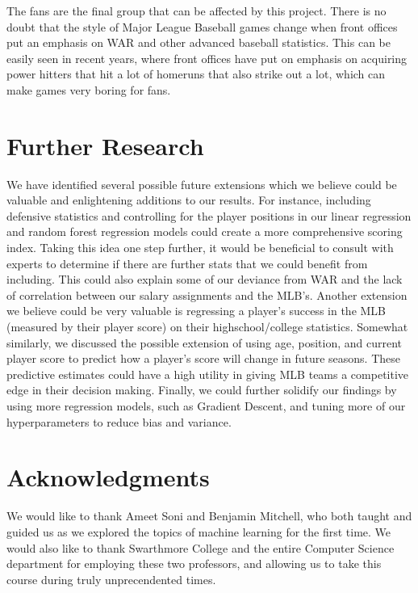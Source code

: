 \documentclass{article}
\begin{document}
The fans are the final group that can be affected by this project. There is no doubt that the style of Major League Baseball games change when front offices put an emphasis on WAR and other advanced baseball statistics. This can be easily seen in recent years, where front offices have put on emphasis on acquiring power hitters that hit a lot of homeruns that also strike out a lot, which can make games very boring for fans.   


\section{Further Research}
\label{further}

We have identified several possible future extensions which we believe could be valuable and enlightening additions to our results. For instance, including defensive statistics and controlling for the player positions in our linear regression and random forest regression models could create a more comprehensive scoring index. Taking this idea one step further, it would be beneficial to consult with experts to determine if there are further stats that we could benefit from including. This could also explain some of our deviance from WAR and the lack of correlation between our salary assignments and the MLB’s. Another extension we believe could be very valuable is regressing a player’s success in the MLB (measured by their player score) on their highschool/college statistics. Somewhat similarly, we discussed the possible extension of using age, position, and current player score to predict how a player’s score will change in future seasons. These predictive estimates could have a high utility in giving MLB teams a competitive edge in their decision making. Finally, we could further solidify our findings by using more regression models, such as Gradient Descent, and tuning more of our hyperparameters to reduce bias and variance.


\section*{Acknowledgments}

We would like to thank Ameet Soni and Benjamin Mitchell, who both taught and guided us as we explored the topics of machine learning for the first time.
We would also like to thank Swarthmore College and the entire Computer Science department for employing these two professors, and allowing us to take this course during truly unprecendented times.



\end{document}
